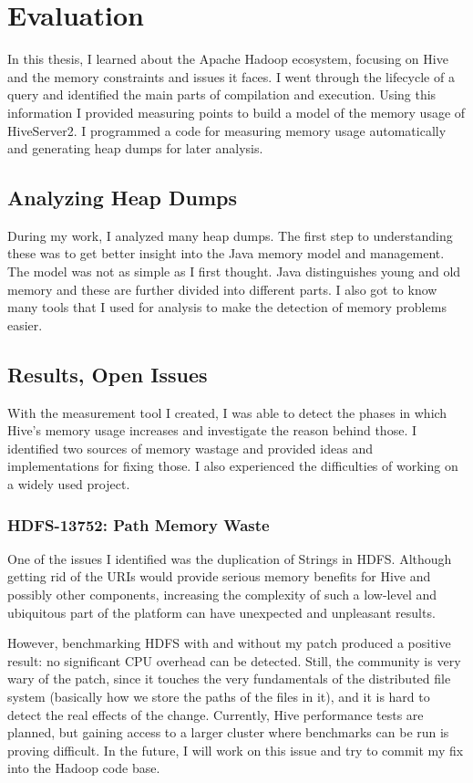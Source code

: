 \chapter{Evaluation}
In this thesis, I learned about the Apache Hadoop ecosystem, focusing on Hive and the memory constraints and issues it faces. I went through the lifecycle of a query and identified the main parts of compilation and execution. Using this information I provided measuring points to build a model of the memory usage of HiveServer2. I programmed a code for measuring memory usage automatically and generating heap dumps for later analysis.

\section{Analyzing Heap Dumps}
During my work, I analyzed many heap dumps. The first step to understanding these was to get better insight into the Java memory model and management. The model was not as simple as I first thought. Java distinguishes young and old memory and these are further divided into different parts. I also got to know many tools that I used for analysis to make the detection of memory problems easier. 

\section{Results, Open Issues}
With the measurement tool I created, I was able to detect the phases in which Hive's memory usage increases and investigate the reason behind those. I identified two sources of memory wastage and provided ideas and implementations for fixing those. I also experienced the difficulties of working on a widely used project.

\subsection{HDFS-13752: Path Memory Waste}
One of the issues I identified was the duplication of Strings in HDFS. Although getting rid of the URIs would provide serious memory benefits for Hive and possibly other components, increasing the complexity of such a low-level and ubiquitous part of the platform can have unexpected and unpleasant results. 

However, benchmarking HDFS with and without my patch produced a positive result: no significant CPU overhead can be detected. Still, the community is very wary of the patch, since it touches the very fundamentals of the distributed file system (basically how we store the paths of the files in it), and it is hard to detect the real effects of the change. Currently, Hive performance tests are planned, but gaining access to a larger cluster where benchmarks can be run is proving difficult. In the future, I will work on this issue and try to commit my fix into the Hadoop code base.

